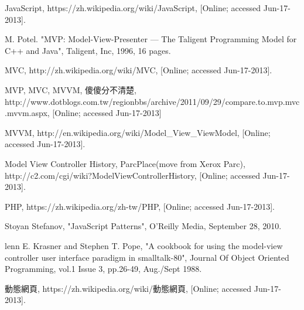 \documentclass[a4paper,12pt]{report}
\begin{document}
\begin{thebibliography}{1}
JavaScript, https://zh.wikipedia.org/wiki/JavaScript, [Online; accessed Jun-17-2013]. 

M. Potel. "MVP: Model-View-Presenter — The Taligent Programming Model for C++ and Java", Taligent, Inc, 1996, 16 pages. 

MVC, http://zh.wikipedia.org/wiki/MVC, [Online; accessed Jun-17-2013]. 

MVP, MVC, MVVM, 傻傻分不清楚, http://www.dotblogs.com.tw/regionbbs/archive/2011/09/29/compare.to.mvp.mvc.mvvm.aspx, [Online; accessed Jun-17-2013] 

MVVM, http://en.wikipedia.org/wiki/Model\_View\_ViewModel, [Online; accessed Jun-17-2013]. 

Model View Controller History, ParcPlace(move from Xerox Parc), http://c2.com/cgi/wiki?ModelViewControllerHistory, [Online; accessed Jun-17-2013]. 

PHP, https://zh.wikipedia.org/zh-tw/PHP, [Online; accessed Jun-17-2013]. 

Stoyan Stefanov, "JavaScript Patterns", O'Reilly Media, September 28, 2010. 

lenn E. Krasner and Stephen T. Pope, "A cookbook for using the model-view controller user interface paradigm in smalltalk-80", Journal Of Object Oriented Programming, vol.1 Issue 3, pp.26-49, Aug./Sept 1988. 

動態網頁, https://zh.wikipedia.org/wiki/動態網頁, [Online; accessed Jun-17-2013]. 
\end{thebibliography}


\clearpage
\end{document}
